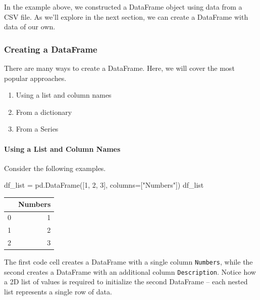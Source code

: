 \documentclass[
  letterpaper,
  DIV=11,
  numbers=noendperiod]{scrreprt}
\let\oldparagraph\paragraph
\renewcommand{\paragraph}[1]{\oldparagraph{#1}\mbox{}}
\newenvironment{Shaded}{\begin{snugshade}}{\end{snugshade}}
\newcommand{\DecValTok}[1]{\textcolor[rgb]{0.68,0.00,0.00}{#1}}
\newcommand{\NormalTok}[1]{\textcolor[rgb]{0.00,0.23,0.31}{#1}}
\newcommand{\OperatorTok}[1]{\textcolor[rgb]{0.37,0.37,0.37}{#1}}
\newcommand{\StringTok}[1]{\textcolor[rgb]{0.13,0.47,0.30}{#1}}
\providecommand{\tightlist}{%
  \setlength{\itemsep}{0pt}\setlength{\parskip}{0pt}}\usepackage{longtable,booktabs,array}
\begin{document}
In the example above, we constructed a DataFrame object using data from
a CSV file. As we'll explore in the next section, we can create a
DataFrame with data of our own.

\hypertarget{creating-a-dataframe}{%
\subsubsection{Creating a DataFrame}\label{creating-a-dataframe}}

There are many ways to create a DataFrame. Here, we will cover the most
popular approaches.

\begin{enumerate}
\def\labelenumi{\arabic{enumi}.}
\tightlist
\item
  Using a list and column names
\item
  From a dictionary
\item
  From a Series
\end{enumerate}

\hypertarget{using-a-list-and-column-names}{%
\paragraph{Using a List and Column
Names}\label{using-a-list-and-column-names}}

Consider the following examples.

\begin{Shaded}
\begin{Highlighting}[]
\NormalTok{df\_list }\OperatorTok{=}\NormalTok{ pd.DataFrame([}\DecValTok{1}\NormalTok{, }\DecValTok{2}\NormalTok{, }\DecValTok{3}\NormalTok{], columns}\OperatorTok{=}\NormalTok{[}\StringTok{"Numbers"}\NormalTok{])}
\NormalTok{df\_list}
\end{Highlighting}
\end{Shaded}

\begin{tabular}{lr}
\toprule
{} &  Numbers \\
\midrule
0 &        1 \\
1 &        2 \\
2 &        3 \\
\bottomrule
\end{tabular}

The first code cell creates a DataFrame with a single column
\texttt{Numbers}, while the second creates a DataFrame with an
additional column \texttt{Description}. Notice how a 2D list of values
is required to initialize the second DataFrame -- each nested list
represents a single row of data.
\end{document}
